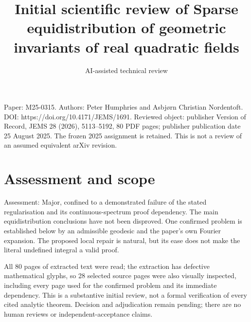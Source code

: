 \documentclass[10pt]{article}
\title{Initial scientific review of
Sparse equidistribution of geometric invariants of real quadratic fields}
\author{AI-assisted technical review}
\date{}
\begin{document}
\maketitle
Paper: M25-0315. Authors: Peter Humphries and Asbjørn Christian Nordentoft. DOI: https://doi.org/10.4171/JEMS/1691. Reviewed object: publisher Version of Record, JEMS 28 (2026), 5113–5192, 80 PDF pages; publisher publication date 25 August 2025. The frozen 2025 assignment is retained. This is not a review of an assumed equivalent arXiv revision.\par
\section*{Assessment and scope}
Assessment: Major, confined to a demonstrated failure of the stated regularisation and its continuous-spectrum proof dependency. The main equidistribution conclusions have not been disproved. One confirmed problem is established below by an admissible geodesic and the paper’s own Fourier expansion. The proposed local repair is natural, but its ease does not make the literal undefined integral a valid proof.\par
All 80 pages of extracted text were read; the extraction has defective mathematical glyphs, so 28 selected source pages were also visually inspected, including every page used for the confirmed problem and its immediate dependency. This is a substantive initial review, not a formal verification of every cited analytic theorem. Decision and adjudication remain pending; there are no human reviews or independent-acceptance claims.\par
\end{document}
